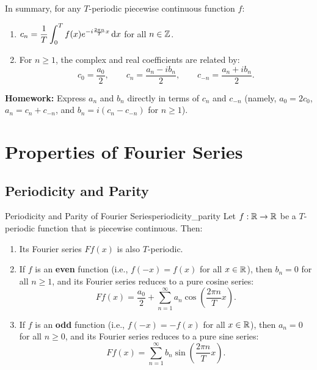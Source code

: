 \begin{remarque}
    In summary, for any $T$-periodic piecewise continuous function $f$:
    \begin{enumerate}
        \item $c_n = \dfrac{1}{T} \displaystyle\int_{0}^{T} f(x) e^{-i \frac{2\pi n}{T} x} \,\mathrm{d}x$ for all $n \in \mathbb{Z}$.
        \item For $n \ge 1$, the complex and real coefficients are related by:
        \[
            c_0 = \frac{a_0}{2}, \qquad c_n = \frac{a_n - i b_n}{2}, \qquad c_{-n} = \frac{a_n + i b_n}{2}.
        \]
    \end{enumerate}
    \textbf{Homework:} Express $a_n$ and $b_n$ directly in terms of $c_n$ and $c_{-n}$ (namely, $a_0 = 2c_0$, $a_n = c_n + c_{-n}$, and $b_n = i(c_n - c_{-n})$ for $n \ge 1$).
\end{remarque}

\section{Properties of Fourier Series}

\subsection{Periodicity and Parity}

\begin{theoreme}{Periodicity and Parity of Fourier Series}{periodicity_parity}
    Let $f : \mathbb{R} \to \mathbb{R}$ be a $T$-periodic function that is piecewise continuous. Then:
    \begin{enumerate}
        \item[(a)] Its Fourier series $Ff(x)$ is also $T$-periodic.
        \item[(b)] If $f$ is an \textbf{even} function (i.e., $f(-x) = f(x)$ for all $x \in \mathbb{R}$), then $b_n = 0$ for all $n \ge 1$, and its Fourier series reduces to a pure cosine series:
        \[
            Ff(x) = \frac{a_0}{2} + \sum_{n=1}^{\infty} a_n \cos\left(\frac{2\pi n}{T} x\right).
        \]
        \item[(c)] If $f$ is an \textbf{odd} function (i.e., $f(-x) = -f(x)$ for all $x \in \mathbb{R}$), then $a_n = 0$ for all $n \ge 0$, and its Fourier series reduces to a pure sine series:
        \[
            Ff(x) = \sum_{n=1}^{\infty} b_n \sin\left(\frac{2\pi n}{T} x\right).
        \]
    \end{enumerate}
\end{theoreme}

